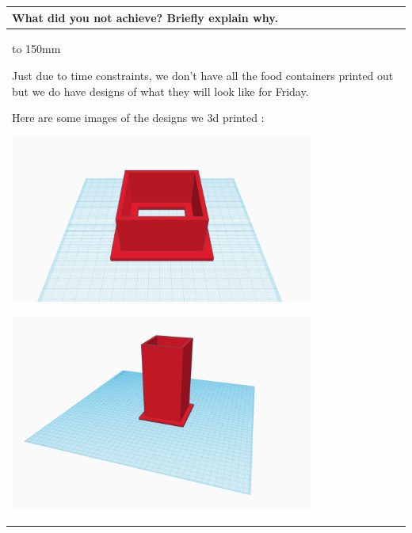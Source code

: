 \documentclass[a4paper]{article}
\newcommand{\colWidth}{141mm}
\begin{document}
\begin{center}

\begin{tabular}{|p{\colWidth}|}
	\hline
	\cellcolor{blue!25}\large
	\textbf{What did you not achieve? Briefly explain why.}
	\\ \hline
	\vtop to 150mm{
	
	Just due to time constraints, we don't have all the food containers printed out but we do have designs of what they will look like for Friday.
	\vspace{5mm}
	
	Here are some images of the designs we 3d printed :
	
	\vspace{5mm}
	
	 \includegraphics[width=10cm]{image_1.png}
	 
	 \vspace{5mm}
	  \includegraphics[width=10cm]{image_2.png}
	
	
	

  }
  \\
  \hline
\end{tabular}
\vskip 5mm



\end{center}
\end{document}
